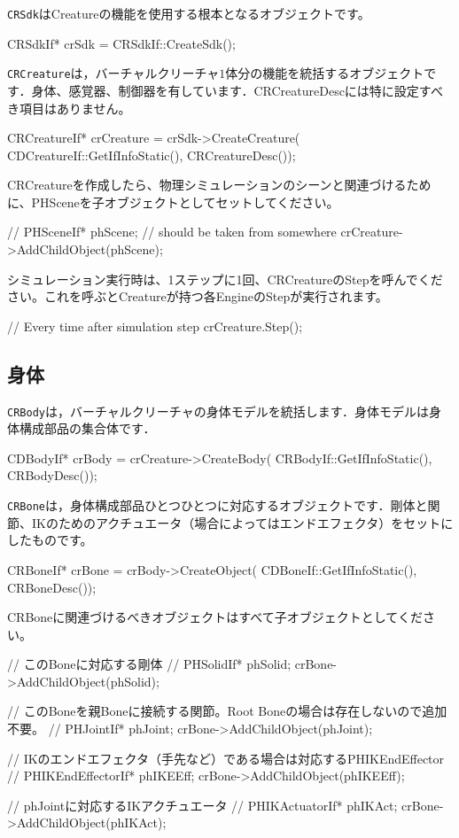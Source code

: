 \texttt{CRSdk}はCreatureの機能を使用する根本となるオブジェクトです。
\begin{sourcecode}
CRSdkIf* crSdk = CRSdkIf::CreateSdk();
\end{sourcecode}

\texttt{CRCreature}は，バーチャルクリーチャ$1$体分の機能を統括するオブジェクトです．身体、感覚器、制御器を有しています．CRCreatureDescには特に設定すべき項目はありません。
\begin{sourcecode}
CRCreatureIf* crCreature = crSdk->CreateCreature(
  CDCreatureIf::GetIfInfoStatic(), CRCreatureDesc());
\end{sourcecode}
CRCreatureを作成したら、物理シミュレーションのシーンと関連づけるために、PHSceneを子オブジェクトとしてセットしてください。
\begin{sourcecode}
// PHSceneIf* phScene;   // should be taken from somewhere
crCreature->AddChildObject(phScene);
\end{sourcecode}

\KLUDGE シミュレーション実行時は、1ステップに1回、CRCreatureのStepを呼んでください。これを呼ぶとCreatureが持つ各EngineのStepが実行されます。
\begin{sourcecode}
// Every time after simulation step
crCreature.Step();
\end{sourcecode}



\subsection{身体}

\texttt{CRBody}は，バーチャルクリーチャの身体モデルを統括します．身体モデルは身体構成部品の集合体です．
\begin{sourcecode}
CDBodyIf* crBody = crCreature->CreateBody(
  CRBodyIf::GetIfInfoStatic(), CRBodyDesc());
\end{sourcecode}

\texttt{CRBone}は，身体構成部品ひとつひとつに対応するオブジェクトです．剛体と関節、IKのためのアクチュエータ（場合によってはエンドエフェクタ）をセットにしたものです。
\begin{sourcecode}
CRBoneIf* crBone = crBody->CreateObject(
  CDBoneIf::GetIfInfoStatic(), CRBoneDesc());
\end{sourcecode}
CRBoneに関連づけるべきオブジェクトはすべて子オブジェクトとしてください。
\begin{sourcecode}
// このBoneに対応する剛体
// PHSolidIf* phSolid; 
crBone->AddChildObject(phSolid);

// このBoneを親Boneに接続する関節。Root Boneの場合は存在しないので追加不要。
// PHJointIf* phJoint;
crBone->AddChildObject(phJoint);

// IKのエンドエフェクタ（手先など）である場合は対応するPHIKEndEffector
// PHIKEndEffectorIf* phIKEEff;
crBone->AddChildObject(phIKEEff);

// phJointに対応するIKアクチュエータ
// PHIKActuatorIf* phIKAct;
crBone->AddChildObject(phIKAct);
\end{sourcecode}


